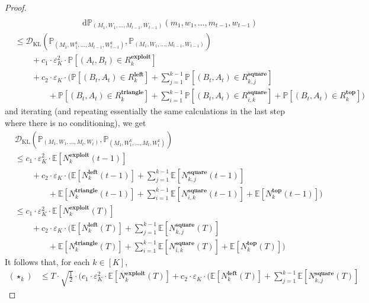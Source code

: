 \documentclass[final,12pt]{colt2025}
\newcommand{\cD}{\mathcal{D}}
\newcommand{\E}{\mathbb{E}}
\newcommand{\Pb}{\mathbb{P}}
\newcommand{\e}{\varepsilon}
\newcommand{\lrb}[1]{\left(#1\right)}
\newcommand{\lsb}[1]{\left[#1\right]}
\newcommand{\dif}{\,\mathrm{d}}
\newcommand{\nP}{M}
\newcommand{\np}{m}
\newcommand{\nB}{B}
\newcommand{\nS}{A}
\newcommand{\nc}{c}
\newcommand{\nW}{W}
\newcommand{\nw}{w}
\begin{document}
{\begin{proof}
\begin{align*}
\\ & \qquad\qquad\qquad\qquad
    \dif \Pb_{(\nP_1,\nW_1,\dots,\nP_{t-1},W_{t-1})}(\np_1,\nw_1,\dots,\np_{t-1},w_{t-1})
\\
&\le
    \cD_{\text{KL}}\lrb{\Pb_{(\nP_1,\nW_1^k,\dots,\nP_{t-1},W_{t-1}^k)},\Pb_{(\nP_1,\nW_1,\dots,\nP_{t-1},W_{t-1})}}
\\
&\qquad+
    \nc_1 \cdot \e_K^2 \cdot \Pb\lsb{(\nS_t,\nB_t) \in R^{\textbf{exploit}}_k }
\\
&\qquad+
    c_2 \cdot \e_K \cdot \bigg(\Pb\lsb{(\nB_t,\nS_t) \in R^{\textbf{left}}_k}
    + \sum_{j=1}^{k-1} \Pb\lsb{(\nB_t,\nS_t) \in R^{\textbf{square}}_{k,j}}
\\
&\qquad\qquad +
    \Pb\lsb{(\nB_t,\nS_t) \in R^{\textbf{triangle}}_{k}}
    + \sum_{i=1}^{k-1} \Pb\lsb{(\nB_t,\nS_t) \in R^{\textbf{square}}_{i,k}}
    + \Pb\lsb{(\nB_t,\nS_t) \in R^{\textbf{top}}_k}\bigg)
\end{align*}
and iterating (and repeating essentially the same calculations in the last step where there is no conditioning), we get
\begin{align*}
&
\cD_{\text{KL}}\lrb{\Pb_{(\nP_1,\nW_1,\dots,\nP_t,\nW_t)},\Pb_{(\nP_1,\nW_1^k,\dots,\nP_t,\nW_t^k)}}
\\&\le
    \nc_1 \cdot \e_K^2 \cdot \E\lsb{ N^{\textbf{exploit}}_k(t-1)}
\\
&\qquad+
    c_2 \cdot \e_K \cdot \bigg(\E\lsb{N^{\textbf{left}}_k(t-1)}
    + \sum_{j=1}^{k-1} \E\lsb{N^{\textbf{square}}_{k,j}(t-1)}
\\
&\qquad\qquad+
    \E\lsb{N^{\textbf{triangle}}_{k}(t-1)}
    + \sum_{i=1}^{k-1} \E\lsb{N^{\textbf{square}}_{i,k}(t-1)}
    + \E\lsb{N^{\textbf{top}}_k(t-1)}\bigg)
\\
&\le
    \nc_1 \cdot \e_K^2 \cdot \E\lsb{ N^{\textbf{exploit}}_k(T)}
\\
&\qquad+
    c_2 \cdot \e_K \cdot \bigg(\E\lsb{N^{\textbf{left}}_k(T)}
    + \sum_{j=1}^{k-1} \E\lsb{N^{\textbf{square}}_{k,j}(T)}
\\
&\qquad\qquad+
    \E\lsb{N^{\textbf{triangle}}_{k}(T)}
    + \sum_{i=1}^{k-1} \E\lsb{N^{\textbf{square}}_{i,k}(T)}
    + \E\lsb{N^{\textbf{top}}_k(T)}\bigg)
\end{align*}
It follows that, for each $k \in [K]$,
\begin{align*}
    (\star_k)
&\le
    T \cdot \sqrt{ \frac{1}{2} } \cdot \bigg( \nc_1 \cdot \e_K^2 \cdot \E\lsb{ N^{\textbf{exploit}}_k(T)}
+
    c_2 \cdot \e_K \cdot \bigg(\E\lsb{N^{\textbf{left}}_k(T)}
    + \sum_{j=1}^{k-1} \E\lsb{N^{\textbf{square}}_{k,j}(T)}

\end{align*}
\end{proof}}
\end{document}
